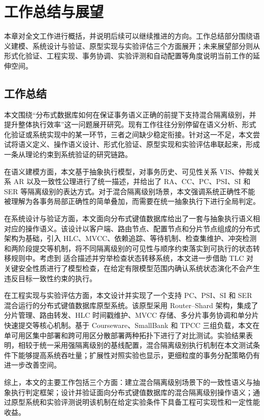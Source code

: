 \chapter{工作总结与展望}
本章对全文工作进行概括，并说明后续可以继续推进的方向。工作总结部分围绕语义建模、系统设计与验证、原型实现与实验评估三个方面展开；未来展望部分则从形式化验证、工程实现、事务协调、实验评测和自动配置等角度说明当前工作的延伸空间。

\section{工作总结}

本文围绕“分布式数据库如何在保证事务语义正确的前提下支持混合隔离级别，并提升整体执行效率”这一问题展开研究。现有工作往往分别停留在语义分析、形式化验证或系统实现中的某一环节，三者之间缺少稳定衔接。针对这一不足，本文尝试将语义定义、操作语义设计、形式化验证、原型实现和实验评估串联起来，形成一条从理论约束到系统验证的研究链路。

在语义建模方面，本文基于抽象执行模型，对事务历史、可见性关系 $\text{VIS}$、仲裁关系 $\text{AR}$ 以及一致性公理进行了统一描述，并给出了 RA、CC、PC、PSI、SI 和 SER 等隔离级别的表达方式。对于混合隔离级别场景，本文强调系统正确性不能被理解为各事务局部正确性的简单叠加，而需要在统一抽象执行下进行全局判定。

在系统设计与验证方面，本文面向分布式键值数据库给出了一套与抽象执行语义相对应的操作语义。该设计以客户端、路由节点、配置节点和分片节点组成的分布式架构为基础，引入 HLC、MVCC、依赖追踪、等待机制、检查集维护、冲突检测和两阶段提交等机制，将不同隔离级别的可见性与顺序约束落实到可执行的状态转移规则中。考虑到 \TLAPlus 适合描述并穷举检查状态转移系统，本文进一步借助 TLC 对关键安全性质进行了模型检查，在给定有限模型范围内确认系统状态演化不会产生违反目标一致性约束的执行。

在工程实现与实验评估方面，本文设计并实现了一个支持 PC、PSI、SI 和 SER 混合运行的分布式键值数据库原型系统。该原型采用 Router--Shard 架构，集成了分片管理、路由转发、HLC 时间戳维护、MVCC 存储、多分片事务协调和单分片快速提交等核心机制。基于 Courseware、SmallBank 和 TPCC 三组负载，本文在单可用区集中部署和跨可用区分散部署两种拓扑下进行了对比测试。实验结果表明，相较于统一采用强隔离级别的基线配置，混合隔离级别执行机制在本文测试条件下能够提高系统吞吐量；扩展性对照实验也显示，更细粒度的事务分配策略仍有进一步改善空间。

综上，本文的主要工作包括三个方面：建立混合隔离级别场景下的一致性语义与抽象执行判定框架；设计并验证面向分布式键值数据库的混合隔离级别操作语义；通过原型系统和实验评测说明该机制在给定实验条件下具备工程可实现性和一定性能收益。

